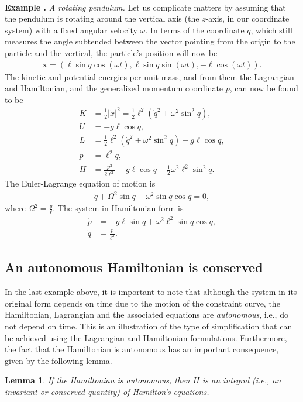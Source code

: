 \documentclass[12pt]{amsart}
\newcommand{\eqst}[1]{\begin{align*}#1\end{align*}}
\newtheorem{lem}[thm]{Lemma}
\newcounter{example}
\newcommand{\beginexample}[1]{\ \\ \addtocounter{example}{1} \textbf{Example \arabic{example}.} \textit{#1.}}
\begin{document}
\beginexample{A rotating pendulum}
Let us complicate matters by assuming that the pendulum is rotating around the vertical axis (the $z$-axis, in our coordinate system) with a fixed angular velocity $\omega$. In terms of the coordinate $q$, which still measures the angle subtended between the vector pointing from the origin to the particle and the vertical, the particle's position will now be
\eqst{
\mathbf{x} = (\ell \sin q \cos(\omega t), \ell \sin q \sin(\omega t), -\ell\cos(\omega t)). 
}
The kinetic and potential energies per unit mass, and from them the Lagrangian and Hamiltonian, and the generalized momentum coordinate $p$, can now be found to be
\eqst{
K &= \tfrac12|\dot{x}|^2 = \tfrac12 \ell^2(\dot{q}^2 + \omega^2 \sin^2 q), \\
U &= -g\ell \cos q, \\
L &= \tfrac12\ell^2(\dot{q}^2+\omega^2\sin^2 q)+g\ell\cos q, \\
p &= \ell^2 \dot{q}, \\
H &= \frac{p^2}{2\ell^2}-g\ell\cos q-\tfrac12 \omega^2 \ell^2 \sin^2 q.
}
The Euler-Lagrange equation of motion is
\eqst{
\ddot{q} + \Omega^2 \sin q - \omega^2 \sin q \cos q = 0,
}
where $\Omega^2 = \frac{g}{\ell}$. The system in Hamiltonian form is
\eqst{
\dot{p} &= -g\ell \sin q + \omega^2 \ell^2 \sin q \cos q, \\
\dot{q} &= \frac{p}{\ell^2}.
}

\subsection{An autonomous Hamiltonian is conserved} In the last example above, it is important to note that although the system in its original form depends on time due to the motion of the constraint curve, the Hamiltonian, Lagrangian and the associated equations are \emph{autonomous}, i.e., do not depend on time. This is an illustration of the type of simplification that can be achieved using the Lagrangian and Hamiltonian formulations. Furthermore, the fact that the Hamiltonian is autonomous has an important consequence, given by the following lemma.

\begin{lem} \label{lem:hamiltonian-conserved}
If the Hamiltonian is autonomous, then $H$ is an integral (i.e., an invariant or conserved quantity) of Hamilton's equations.
\end{lem}
\end{document}
